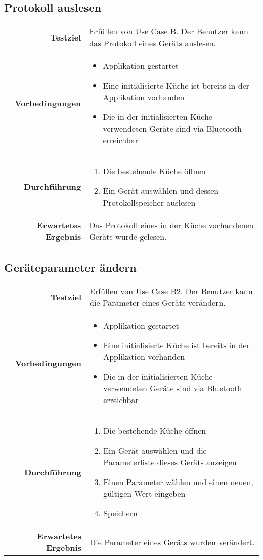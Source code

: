 \subsection{Protokoll auslesen}
\begin{table}[H]
\begin{tabularx}{\textwidth}{r X }
\textbf{Testziel} & Erfüllen von Use Case B. Der Benutzer kann das Protokoll eines Geräts auslesen. \\
\textbf{Vorbedingungen} & \begin{itemize}
\item Applikation gestartet
\item Eine initialisierte Küche ist bereits in der Applikation vorhanden
\item Die in der initialisierten Küche verwendeten Geräte sind via Bluetooth erreichbar
\end{itemize} \\
\textbf{Durchführung} & \begin{enumerate}
\item Die bestehende Küche öffnen
\item Ein Gerät auswählen und dessen Protokollspeicher auslesen
\end{enumerate} \\
\textbf{Erwartetes Ergebnis} & Das Protokoll eines in der Küche vorhandenen Geräts wurde gelesen.\\
\end{tabularx}
\end{table}

\subsection{Geräteparameter ändern}
\begin{table}[H]
\begin{tabularx}{\textwidth}{r X }
\textbf{Testziel} & Erfüllen von Use Case B2. Der Benutzer kann die Parameter eines Geräts verändern. \\
\textbf{Vorbedingungen} & \begin{itemize}
\item Applikation gestartet
\item Eine initialisierte Küche ist bereits in der Applikation vorhanden
\item Die in der initialisierten Küche verwendeten Geräte sind via Bluetooth erreichbar
\end{itemize} \\
\textbf{Durchführung} & \begin{enumerate}
\item Die bestehende Küche öffnen
\item Ein Gerät auswählen und die Parameterliste dieses Geräts anzeigen
\item Einen Parameter wählen und einen neuen, gültigen Wert eingeben
\item Speichern
\end{enumerate} \\
\textbf{Erwartetes Ergebnis} & Die Parameter eines Geräts wurden verändert.\\
\end{tabularx}
\end{table}

